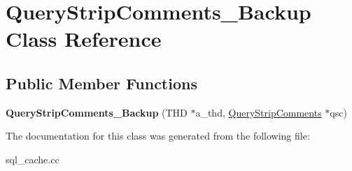 \hypertarget{classQueryStripComments__Backup}{}\section{Query\+Strip\+Comments\+\_\+\+Backup Class Reference}
\label{classQueryStripComments__Backup}
\subsection*{Public Member Functions}
\begin{DoxyCompactItemize}
\item 
\mbox{\label{classQueryStripComments__Backup_a505abfc4c88fee044aefd0ae30c63919}} 
{\bfseries Query\+Strip\+Comments\+\_\+\+Backup} (T\+HD $\ast$a\+\_\+thd, \mbox{\hyperlink{classQueryStripComments}{Query\+Strip\+Comments}} $\ast$qsc)
\end{DoxyCompactItemize}


The documentation for this class was generated from the following file\+:\begin{DoxyCompactItemize}
\item 
sql\+\_\+cache.\+cc\end{DoxyCompactItemize}
